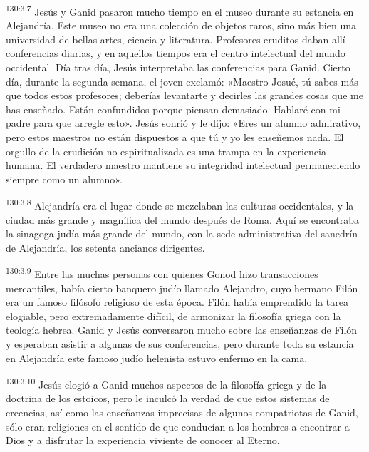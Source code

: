 \par
\textsuperscript{130:3.7} Jesús y Ganid pasaron mucho tiempo en el museo durante su estancia en Alejandría. Este museo no era una colección de objetos raros, sino más bien una universidad de bellas artes, ciencia y literatura. Profesores eruditos daban allí conferencias diarias, y en aquellos tiempos era el centro intelectual del mundo occidental. Día tras día, Jesús interpretaba las conferencias para Ganid. Cierto día, durante la segunda semana, el joven exclamó: «Maestro Josué, tú sabes más que todos estos profesores; deberías levantarte y decirles las grandes cosas que me has enseñado. Están confundidos porque piensan demasiado. Hablaré con mi padre para que arregle esto». Jesús sonrió y le dijo: «Eres un alumno admirativo, pero estos maestros no están dispuestos a que tú y yo les enseñemos nada. El orgullo de la erudición no espiritualizada es una trampa en la experiencia humana. El verdadero maestro mantiene su integridad intelectual permaneciendo siempre como un alumno».

\par
\textsuperscript{130:3.8} Alejandría era el lugar donde se mezclaban las culturas occidentales, y la ciudad más grande y magnífica del mundo después de Roma. Aquí se encontraba la sinagoga judía más grande del mundo, con la sede administrativa del sanedrín de Alejandría, los setenta ancianos dirigentes.

\par
\textsuperscript{130:3.9} Entre las muchas personas con quienes Gonod hizo transacciones mercantiles, había cierto banquero judío llamado Alejandro, cuyo hermano Filón era un famoso filósofo religioso de esta época. Filón había emprendido la tarea elogiable, pero extremadamente difícil, de armonizar la filosofía griega con la teología hebrea. Ganid y Jesús conversaron mucho sobre las enseñanzas de Filón y esperaban asistir a algunas de sus conferencias, pero durante toda su estancia en Alejandría este famoso judío helenista estuvo enfermo en la cama.

\par
\textsuperscript{130:3.10} Jesús elogió a Ganid muchos aspectos de la filosofía griega y de la doctrina de los estoicos, pero le inculcó la verdad de que estos sistemas de creencias, así como las enseñanzas imprecisas de algunos compatriotas de Ganid, sólo eran religiones en el sentido de que conducían a los hombres a encontrar a Dios y a disfrutar la experiencia viviente de conocer al Eterno.

